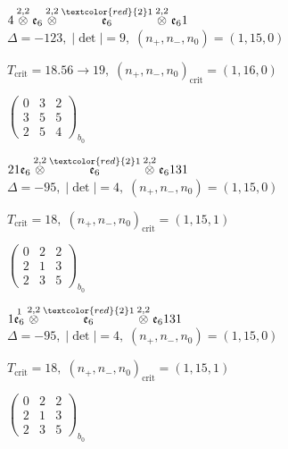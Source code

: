 \documentclass[10pt]{article}
\begin{document}
\smallskip

$4\overset{2,2}{\otimes}\mathfrak{e}_6\overset{2,2}{\otimes}\overset{\textcolor{red}{2}1}{\mathfrak{e}_6}\overset{2,2}{\otimes}\mathfrak{e}_61$ \quad $\Delta=-123,\; |\det|=9,\; (n_+,n_-,n_0)=(1,15,0)$

\hspace{1em}$T_{\text{crit}}=18.56 \to 19,\; (n_+,n_-,n_0)_{\text{crit}}=(1,16,0)$

\hspace{2em}$\left(\begin{smallmatrix}0 & 3 & 2 \\ 3 & 5 & 5 \\ 2 & 5 & 4\end{smallmatrix}\right)_{\!b_0}$

\smallskip

$21\mathfrak{e}_6\overset{2,2}{\otimes}\overset{\textcolor{red}{2}1}{\mathfrak{e}_6}\overset{2,2}{\otimes}\mathfrak{e}_6131$ \quad $\Delta=-95,\; |\det|=4,\; (n_+,n_-,n_0)=(1,15,0)$

\hspace{1em}$T_{\text{crit}}=18,\; (n_+,n_-,n_0)_{\text{crit}}=(1,15,1)$

\hspace{2em}$\left(\begin{smallmatrix}0 & 2 & 2 \\ 2 & 1 & 3 \\ 2 & 3 & 5\end{smallmatrix}\right)_{\!b_0}$

\smallskip

$1\overset{1}{\mathfrak{e}_6}\overset{2,2}{\otimes}\overset{\textcolor{red}{2}1}{\mathfrak{e}_6}\overset{2,2}{\otimes}\mathfrak{e}_6131$ \quad $\Delta=-95,\; |\det|=4,\; (n_+,n_-,n_0)=(1,15,0)$

\hspace{1em}$T_{\text{crit}}=18,\; (n_+,n_-,n_0)_{\text{crit}}=(1,15,1)$

\hspace{2em}$\left(\begin{smallmatrix}0 & 2 & 2 \\ 2 & 1 & 3 \\ 2 & 3 & 5\end{smallmatrix}\right)_{\!b_0}$
\end{document}
